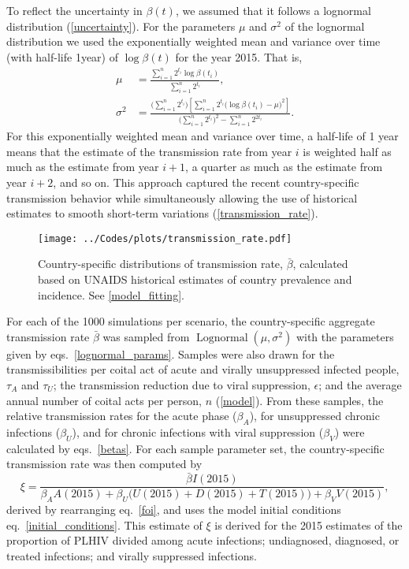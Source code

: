 \documentclass{article}
\DeclareMathOperator{\Lognormal}{Lognormal}
\begin{document}
To reflect the uncertainty in $\beta(t)$, we assumed that it follows a
lognormal distribution (\autoref{uncertainty}). For the parameters
$\mu$ and $\sigma^2$ of the lognormal distribution we used the
exponentially weighted mean and variance\cite{holt2004} over time
(with half-life 1\;year) of $\log \beta(t)$ for the year 2015.  That
is,
\begin{equation}
  \label{lognormal_params}
  \begin{split}
    \mu &= \frac{\sum_{i = 1}^n  2^{t_i}
      \log \beta(t_i)}
    {\sum_{i = 1}^n 2^{t_i}},
    \\
    \sigma^2 &= \frac{\big(\sum_{i = 1}^n 2^{t_i}\big)
      \left[\sum_{i = 1}^n  2^{t_i}
        \big(\log \beta(t_i) - \mu\big)^2\right]}
    {\big(\sum_{i = 1}^n 2^{t_i}\big)^2
      - \sum_{i = 1}^n 2^{2 t_i}}.
  \end{split}
\end{equation}
For this exponentially weighted mean and variance over time, a
half-life of 1 year means that the estimate of the transmission rate
from year $i$ is weighted half as much as the estimate from year
$i + 1$, a quarter as much as the estimate from year $i + 2$, and so
on.  This approach captured the recent country-specific transmission
behavior while simultaneously allowing the use of historical estimates
to smooth short-term variations (\autoref{transmission_rate}).

\begin{figure}
  \centering
  \texttt{[image: ../Codes/plots/transmission\_rate.pdf]}
  \caption{Country-specific distributions of transmission rate,
    $\bar{\beta}$, calculated based on UNAIDS historical estimates of
    country prevalence and incidence.  See \autoref{model_fitting}.}
  \label{transmission_rate}
\end{figure}

For each of the 1000 simulations per scenario, the country-specific
aggregate transmission rate $\bar{\beta}$ was sampled from
$\Lognormal(\mu, \sigma^2)$ with the parameters given by
eqs.~\eqref{lognormal_params}. Samples were also drawn for the
transmissibilities per coital act of acute and virally unsuppressed
infected people, $\tau_A$ and $\tau_U$; the transmission reduction due
to viral suppression, $\epsilon$; and the average annual number of
coital acts per person, $n$ (\autoref{model}).  From these samples,
the relative transmission rates for the acute phase ($\beta_A$), for
unsuppressed chronic infections ($\beta_U$), and for chronic
infections with viral suppression ($\beta_V$) were calculated by
eqs.~\eqref{betas}.  For each sample parameter set, the
country-specific transmission rate was then computed by
\begin{equation}
  \label{eta}
  \xi = \frac{\bar{\beta} I(2015)}{
    \beta_A A(2015) + \beta_U \big(U(2015) + D(2015) + T(2015)\big)
    + \beta_V V(2015)},
\end{equation}
derived by rearranging eq.~\eqref{foi}, and uses the model initial
conditions eq.~\eqref{initial_conditions}.  This estimate of $\xi$ is
derived for the 2015 estimates of the proportion of PLHIV divided
among acute infections; undiagnosed, diagnosed, or treated infections;
and virally suppressed infections.
\end{document}
